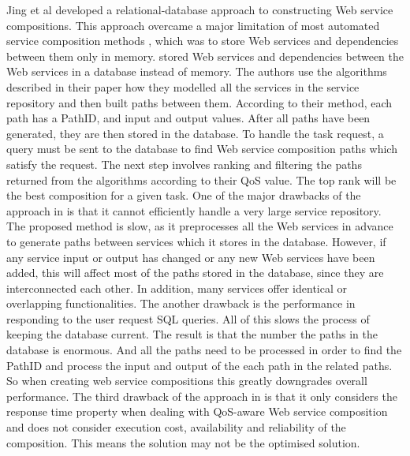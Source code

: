 Jing et al \cite{26} developed a relational-database approach to constructing Web service compositions. This approach overcame a major limitation of most automated service composition methods \cite{2,5}, which was to store Web services and dependencies between them only in memory. \cite{26} stored Web services and dependencies between the Web services in a database instead of memory. The authors use the algorithms described in their paper how they modelled all the services in the service repository and then built paths between them. According to their method, each path has a PathID, and input and output values. After all paths have been generated, they are then stored in the database. To handle the task request, a query must be sent to the database to find Web service composition paths which satisfy the request. The next step involves ranking and filtering the paths returned from the algorithms according to their QoS value. The top rank will be the best composition for a given task. One of the major drawbacks of the approach in \cite{26} is that it cannot efficiently handle a very large service repository. The proposed method is slow, as it preprocesses all the Web services in advance to generate paths between services which it stores in the database. However, if any service input or output has changed or any new Web services have been added, this will affect most of the paths stored in the database, since they are interconnected each other. In addition, many services offer identical or overlapping functionalities.  The another drawback is the performance in responding to the user request SQL queries. All of this slows the process of keeping the database current. The result is that the number the paths in the database is enormous. And all the paths need to be processed in order to find the PathID and process the input and output of the each path in the related paths. So when creating web service compositions this greatly downgrades overall performance. The third drawback of the approach in \cite{26} is that it only considers the response time property when dealing with QoS-aware Web service composition and does not consider execution cost, availability and reliability of the composition. This means the solution may not be the optimised solution.\par


